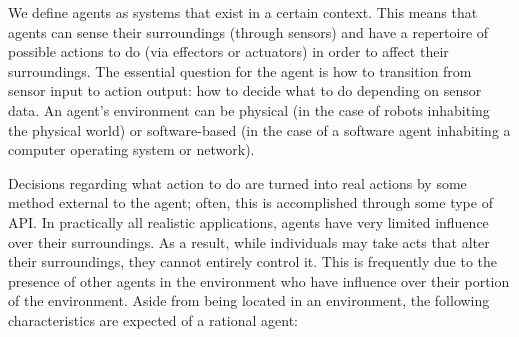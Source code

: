We define agents as systems that exist in a certain context. This means that agents can sense their surroundings (through sensors) and have a repertoire of possible actions to do (via effectors or actuators) in order to affect their surroundings. The essential question for the agent is how to transition from sensor input to action output: how to decide what to do depending on sensor data. An agent's environment can be physical (in the case of robots inhabiting the physical world) or software-based (in the case of a software agent inhabiting a computer operating system or network).

\vspace{.5cm}

Decisions regarding what action to do are turned into real actions by some method external to the agent; often, this is accomplished through some type of \ac{API}. In practically all realistic applications, agents have very limited influence over their surroundings. As a result, while individuals may take acts that alter their surroundings, they cannot entirely control it. This is frequently due to the presence of other agents in the environment who have influence over their portion of the environment. Aside from being located in an environment, the following characteristics are expected of a rational agent:

\vspace{.5cm}

